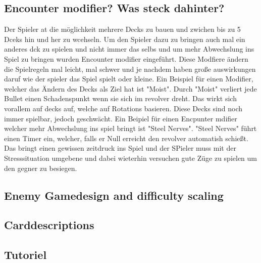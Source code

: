 \subsection{Encounter modifier? Was steck dahinter?}\label{subsec:placementMatters}

Der Spieler at die möglichkeit mehrere Decks zu bauen und zwichen bis zu 5 Dceks hin und her zu wcehseln.
Um den Spieler dazu zu bringen auch mal ein anderes dck zu spielen und nicht immer das selbs und um mehr
Abwechslung ins Spiel zu bringen wurden Encounter modifier eingeführt.
Diese Modfiere ändern die Spielregeln mal leicht, mal schwer und je nachdem haben große auswirkungen daruf wie der spieler das Spiel spielt oder kleine.
Ein Beispiel für einen Modifier, welcher das Ändern des Decks als Ziel hat ist "Moist". Durch "Moist" verliert jede Bullet einen Schadenspunkt wenn sie sich im revolver dreht.
Das wirkt sich vorallem auf decks auf, welche auf Rotations basieren. Diese Decks sind noch immer spielbar, jedoch geschwächt.
Ein Beipiel für einen Encpunter mdifier welcher mehr Abwechslung ins spiel bringt ist "Steel Nerves". "Steel Nerves" führt
einen Timer ein, welcher, falls er Null erreicht den revolver automatish schießt. Das bringt einen gewissen zeitdruck
ins Spiel und der SPieler muss mit der Stresssituation umgebene und dabei wieterhin versuchen gute Züge zu spielen um den gegner zu besiegen. %

\subsection{Enemy Gamedesign and difficulty scaling}\label{subsec:placementMatters}







\subsection{Carddescriptions}\label{subsec:placementMatters}

\subsection{Tutoriel}\label{subsec:placementMatters}



